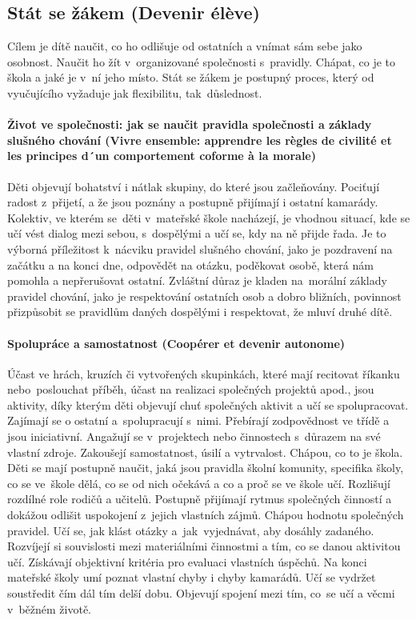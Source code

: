 		\subsection{Stát se žákem (Devenir élève)}
			Cílem je dítě naučit, co ho odlišuje od ostatních a vnímat sám sebe jako osobnost. Naučit ho žít v organizované společnosti s pravidly. Chápat, co je to škola a jaké je v ní jeho místo. Stát se žákem je postupný proces, který od vyučujícího vyžaduje jak flexibilitu, tak důslednost.
			\paragraph{Život ve společnosti: jak se naučit pravidla společnosti a základy slušného chování (Vivre ensemble: apprendre les règles de civilité et les principes d´un comportement coforme à la morale)}
				Děti objevují bohatství i nátlak skupiny, do které jsou začleňovány. Pociťují radost z přijetí, a že jsou poznány a postupně přijímají i ostatní kamarády. Kolektiv, ve kterém se děti v mateřské škole nacházejí, je vhodnou situací, kde se učí vést dialog mezi sebou, s dospělými a učí se, kdy na ně přijde řada. Je to výborná příležitost k nácviku pravidel slušného chování, jako je pozdravení na začátku a na konci dne, odpovědět na otázku, poděkovat osobě, která nám pomohla a nepřerušovat ostatní. Zvláštní důraz je kladen na morální základy pravidel chování, jako je respektování ostatních osob a dobro bližních, povinnost přizpůsobit se pravidlům daných dospělými i respektovat, že mluví druhé dítě. 

			\paragraph{Spolupráce a samostatnost (Coopérer et devenir autonome)}
				Účast ve hrách, kruzích či vytvořených skupinkách, které mají recitovat říkanku nebo poslouchat příběh, účast na realizaci společných projektů apod., jsou aktivity, díky kterým děti objevují chuť společných aktivit a učí se spolupracovat. Zajímají se o ostatní a spolupracují s nimi. Přebírají zodpovědnost ve třídě a jsou iniciativní. Angažují se v projektech nebo činnostech s důrazem na své vlastní zdroje. Zakoušejí samostatnost, úsilí a vytrvalost. Chápou, co to je škola.
				Děti se mají postupně naučit, jaká jsou pravidla školní komunity, specifika školy, co se ve škole dělá, co se od nich očekává a co a proč se ve škole učí. Rozlišují rozdílné role rodičů a učitelů. 
				Postupně přijímají rytmus společných činností a dokážou odlišit uspokojení z jejich vlastních zájmů. Chápou hodnotu společných pravidel. Učí se, jak klást otázky a jak vyjednávat, aby dosáhly zadaného. Rozvíjejí si souvislosti mezi materiálními činnostmi a tím, co se danou aktivitou učí. Získávají objektivní kritéria pro evaluaci vlastních úspěchů. Na konci mateřské školy umí poznat vlastní chyby i chyby kamarádů. Učí se vydržet soustředit čím dál tím delší dobu. Objevují spojení mezi tím, co se učí a věcmi v běžném životě.
